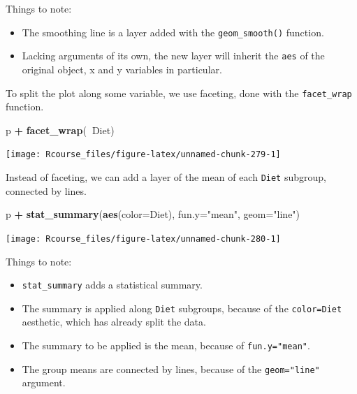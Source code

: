\documentclass[]{book}
\newenvironment{Shaded}{\begin{snugshade}}{\end{snugshade}}
\newcommand{\DataTypeTok}[1]{\textcolor[rgb]{0.13,0.29,0.53}{#1}}
\newcommand{\KeywordTok}[1]{\textcolor[rgb]{0.13,0.29,0.53}{\textbf{#1}}}
\newcommand{\NormalTok}[1]{#1}
\newcommand{\OperatorTok}[1]{\textcolor[rgb]{0.81,0.36,0.00}{\textbf{#1}}}
\newcommand{\StringTok}[1]{\textcolor[rgb]{0.31,0.60,0.02}{#1}}
\providecommand{\tightlist}{%
  \setlength{\itemsep}{0pt}\setlength{\parskip}{0pt}}
\theoremstyle{definition}
\theoremstyle{definition}
\theoremstyle{definition}
\theoremstyle{remark}
\begin{document}
Things to note:

\begin{itemize}
\tightlist
\item
  The smoothing line is a layer added with the \texttt{geom\_smooth()} function.
\item
  Lacking arguments of its own, the new layer will inherit the \texttt{aes} of the original object, x and y variables in particular.
\end{itemize}

To split the plot along some variable, we use faceting, done with the \texttt{facet\_wrap} function.

\begin{Shaded}
\begin{Highlighting}[]
\NormalTok{p }\OperatorTok{+}\StringTok{ }\KeywordTok{facet_wrap}\NormalTok{(}\OperatorTok{~}\NormalTok{Diet)}
\end{Highlighting}
\end{Shaded}

\texttt{[image: Rcourse\_files/figure-latex/unnamed-chunk-279-1]}

Instead of faceting, we can add a layer of the mean of each \texttt{Diet} subgroup, connected by lines.

\begin{Shaded}
\begin{Highlighting}[]
\NormalTok{p }\OperatorTok{+}\StringTok{ }\KeywordTok{stat_summary}\NormalTok{(}\KeywordTok{aes}\NormalTok{(}\DataTypeTok{color=}\NormalTok{Diet), }\DataTypeTok{fun.y=}\StringTok{"mean"}\NormalTok{, }\DataTypeTok{geom=}\StringTok{"line"}\NormalTok{)}
\end{Highlighting}
\end{Shaded}

\texttt{[image: Rcourse\_files/figure-latex/unnamed-chunk-280-1]}

Things to note:

\begin{itemize}
\tightlist
\item
  \texttt{stat\_summary} adds a statistical summary.
\item
  The summary is applied along \texttt{Diet} subgroups, because of the \texttt{color=Diet} aesthetic, which has already split the data.
\item
  The summary to be applied is the mean, because of \texttt{fun.y="mean"}.
\item
  The group means are connected by lines, because of the \texttt{geom="line"} argument.
\end{itemize}
\end{document}
